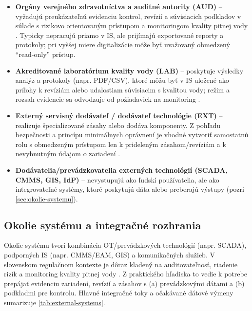 \begin{itemize}
\item \textbf{Orgány verejného zdravotníctva a auditné autority (AUD)} -- vyžadujú preukázateľnú evidenciu kontrol, revízií a súvisiacich podkladov v súlade s rizikovo orientovaným prístupom a monitoringom kvality pitnej vody \cite{EUDWD2020,SKVyhlaska912023,UVZPitnaVodaMapy}. Typicky nepracujú priamo v IS, ale prijímajú exportované reporty a protokoly; pri vyššej miere digitalizácie môže byť uvažovaný obmedzený ``read-only'' prístup.
\item \textbf{Akreditované laboratórium kvality vody (LAB)} -- poskytuje výsledky analýz a protokoly (napr. PDF/CSV), ktoré môžu byť v IS uložené ako prílohy k revíziám alebo udalostiam súvisiacim s kvalitou vody; režim a rozsah evidencie sa odvodzuje od požiadaviek na monitoring \cite{SKVyhlaska912023,EUDWD2020}.
\item \textbf{Externý servisný dodávateľ / dodávateľ technológie (EXT)} -- realizuje špecializované zásahy alebo dodáva komponenty. Z pohľadu bezpečnosti a princípu minimálnych oprávnení je vhodné vytvoriť samostatnú rolu s obmedzeným prístupom len k prideleným zásahom/revíziám a k nevyhnutným údajom o zariadení \cite{NIST80082R3}.
\item \textbf{Dodávatelia/prevádzkovatelia externých technológií (SCADA, CMMS, GIS, IdP)} -- nevystupujú ako ľudskí používatelia, ale ako integrovateľné systémy, ktoré poskytujú dáta alebo preberajú výstupy (pozri \autoref{sec:okolie-systemu}).
\end{itemize}

\subsection{Okolie systému a integračné rozhrania}
\label{sec:okolie-systemu}

Okolie systému tvorí kombinácia OT/prevádzkových technológií (napr. SCADA), podporných IS (napr. CMMS/EAM, GIS) a komunikačných služieb. V slovenskom regulačnom kontexte je dôraz kladený na auditovateľnosť, riadenie rizík a monitoring kvality pitnej vody \cite{EUDWD2020,SKVyhlaska912023}. Z praktického hľadiska to vedie k potrebe prepájať evidenciu zariadení, revízií a zásahov s (a) prevádzkovými dátami a (b) podkladmi pre kontrolu.
Hlavné integračné toky a očakávané dátové výmeny sumarizuje \autoref{tab:external-systems}.

